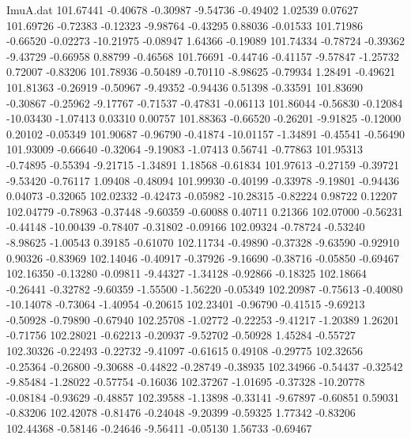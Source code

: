 \begin{filecontents}{ImuA.dat}
 101.67441   -0.40678   -0.30987   -9.54736   -0.49402    1.02539    0.07627
 101.69726   -0.72383   -0.12323   -9.98764   -0.43295    0.88036   -0.01533
 101.71986   -0.66520   -0.02273  -10.21975   -0.08947    1.64366   -0.19089
 101.74334   -0.78724   -0.39362   -9.43729   -0.66958    0.88799   -0.46568
 101.76691   -0.44746   -0.41157   -9.57847   -1.25732    0.72007   -0.83206
 101.78936   -0.50489   -0.70110   -8.98625   -0.79934    1.28491   -0.49621
 101.81363   -0.26919   -0.50967   -9.49352   -0.94436    0.51398   -0.33591
 101.83690   -0.30867   -0.25962   -9.17767   -0.71537   -0.47831   -0.06113
 101.86044   -0.56830   -0.12084  -10.03430   -1.07413    0.03310    0.00757
 101.88363   -0.66520   -0.26201   -9.91825   -0.12000    0.20102   -0.05349
 101.90687   -0.96790   -0.41874  -10.01157   -1.34891   -0.45541   -0.56490
 101.93009   -0.66640   -0.32064   -9.19083   -1.07413    0.56741   -0.77863
 101.95313   -0.74895   -0.55394   -9.21715   -1.34891    1.18568   -0.61834
 101.97613   -0.27159   -0.39721   -9.53420   -0.76117    1.09408   -0.48094
 101.99930   -0.40199   -0.33978   -9.19801   -0.94436    0.04073   -0.32065
 102.02332   -0.42473   -0.05982  -10.28315   -0.82224    0.98722    0.12207
 102.04779   -0.78963   -0.37448   -9.60359   -0.60088    0.40711    0.21366
 102.07000   -0.56231   -0.44148  -10.00439   -0.78407   -0.31802   -0.09166
 102.09324   -0.78724   -0.53240   -8.98625   -1.00543    0.39185   -0.61070
 102.11734   -0.49890   -0.37328   -9.63590   -0.92910    0.90326   -0.83969
 102.14046   -0.40917   -0.37926   -9.16690   -0.38716   -0.05850   -0.69467
 102.16350   -0.13280   -0.09811   -9.44327   -1.34128   -0.92866   -0.18325
 102.18664   -0.26441   -0.32782   -9.60359   -1.55500   -1.56220   -0.05349
 102.20987   -0.75613   -0.40080  -10.14078   -0.73064   -1.40954   -0.20615
 102.23401   -0.96790   -0.41515   -9.69213   -0.50928   -0.79890   -0.67940
 102.25708   -1.02772   -0.22253   -9.41217   -1.20389    1.26201   -0.71756
 102.28021   -0.62213   -0.20937   -9.52702   -0.50928    1.45284   -0.55727
 102.30326   -0.22493   -0.22732   -9.41097   -0.61615    0.49108   -0.29775
 102.32656   -0.25364   -0.26800   -9.30688   -0.44822   -0.28749   -0.38935
 102.34966   -0.54437   -0.32542   -9.85484   -1.28022   -0.57754   -0.16036
 102.37267   -1.01695   -0.37328  -10.20778   -0.08184   -0.93629   -0.48857
 102.39588   -1.13898   -0.33141   -9.67897   -0.60851    0.59031   -0.83206
 102.42078   -0.81476   -0.24048   -9.20399   -0.59325    1.77342   -0.83206
 102.44368   -0.58146   -0.24646   -9.56411   -0.05130    1.56733   -0.69467

\end{filecontents}
